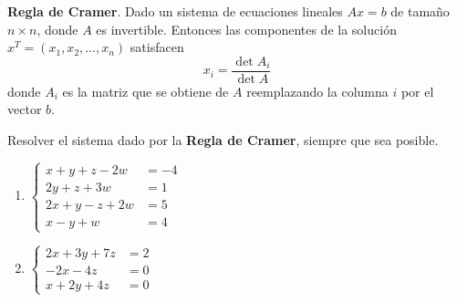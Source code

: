 \begin{definition}
    \textbf{Regla de Cramer}.
    Dado un sistema de ecuaciones lineales \(Ax = b\) de tamaño \(n \times n\), donde \(A\) es invertible.
    Entonces las componentes de la solución \(x^T = \left(x_1 , x_2 , \ldots , x_n \right)\) satisfacen
    \[
        x_i = \frac{\det A_i}{\det A}
    \]
    donde \(A_i\) es la matriz que se obtiene de \(A\) reemplazando la columna \(i\) por el vector \(b\).
\end{definition}
\item Resolver el sistema dado por la \textbf{Regla de Cramer}, siempre que sea posible.
    \begin{enumerate}[label=\listAlph]
        \item 
            \(
                \left\{
                \begin{aligned}
                    x + y + z - 2w &= -4 \\
                    2y + z + 3w &= 1 \\
                    2x + y - z + 2w &= 5 \\
                    x - y + w &= 4
                \end{aligned}
                \right.
            \)
        \item 
            \(
                \left\{
                \begin{aligned}
                    2x + 3y + 7z &= 2 \\
                    -2x - 4z &= 0 \\
                    x + 2y + 4z &= 0
                \end{aligned}
                \right.
            \)
    \end{enumerate}

